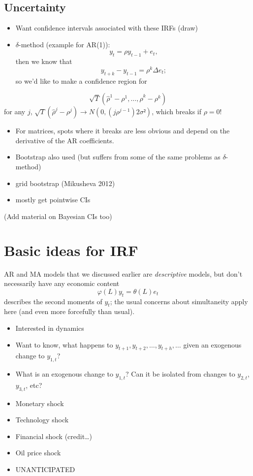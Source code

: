 \subsection{Uncertainty}

\begin{itemize}
\item Want confidence intervals associated with these IRFs (draw)
\item $δ$-method (example for AR(1)): 
  \[y_t = ρ y_{t-1} + e_t,\]
  then we know that 
  \[  y_{t+k} - y_{t-1} = ρ^k Δe_t;\] 
  so we'd like to make a confidence region for
\end{itemize}
\[\sqrt{T} (\hat ρ^1 - ρ^1,…,\hat ρ^k - ρ^k)\]
for any $j$, $\sqrt{T} (\hat ρ^j - ρ^j) → N(0, (j ρ^{j-1}) 2 σ²)$,
which breaks if $ρ = 0$!

\begin{itemize}
\item For matrices, spots where it breaks are less obvious and depend
  on the derivative of the AR coefficients.
\item Bootstrap also used (but suffers from some of the same problems
  as $δ$-method)
\item grid bootstrap (Mikusheva 2012)
\item mostly get pointwise CIs
\end{itemize}

(Add material on Bayesian CIs too)

\section{Basic ideas for IRF}

AR and MA models that we discussed earlier are \emph{descriptive}
models, but don't necessarily have any economic content
\[φ(L) y_t = θ(L) e_t\]
describes the second moments of $y_t$; the usual concerns about
simultaneity apply here (and even more forcefully than usual).

\begin{itemize}
\item Interested in dynamics
\item Want to know, what happens to $y_{t+1}, y_{t+2},…, y_{t+h},…$
  given an exogenous change to $y_{1,t}$?
\item What is an exogenous change to $y_{1,t}$? Can it be isolated
  from changes to $y_{2,t}$, $y_{3,t}$, etc?
\item Monetary shock
\item Technology shock
\item Financial shock (credit…)
\item Oil price shock
\item UNANTICIPATED
\end{itemize}

